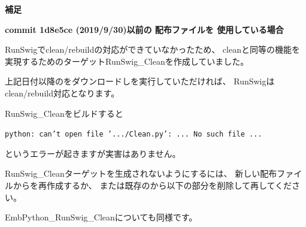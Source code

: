 \bigskip
\bigskip
\noindent
\thinrule{\linewidth}
\noindent
\bf{補足}　
\begin{narrow}
	\bf{commit 1d8e5ce (2019/9/30)以前の\CMakeLists{} 配布ファイルを
	使用している場合}

	\medskip
	RunSwigでclean/rebuildの対応ができていなかったため、
	cleanと同等の機能を実現するためのターゲットRunSwig\_Cleanを作成していました。

	上記日付以降の\SprLib をダウンロードし\cmake を実行していただければ、
	RunSwigはclean/rebuild対応となります。

	RunSwig\_Cleanをビルドすると
	\begin{narrow}
	\tt{python: can't open file '.../Clean.py': ... No such file ...}
	\end{narrow}
	というエラーが起きますが実害はありません。

	RunSwig\_Cleanターゲットを生成されないようにするには、
	新しい配布ファイルから\CMakeLists{}を再作成するか、
	または既存の\CMakeLists{}から以下の部分を削除して再\cmake してください。

	\begin{narrow}\begin{figure}[h]
	    \begin{narrow}[30pt]
		\begin{center}\end{center}
		\label{fig:SpringheadLibraryTree}
	    \end{narrow}
	\end{figure}\end{narrow}
	
	EmbPython\_RunSwig\_Cleanについても同様です。	
	
\end{narrow}

